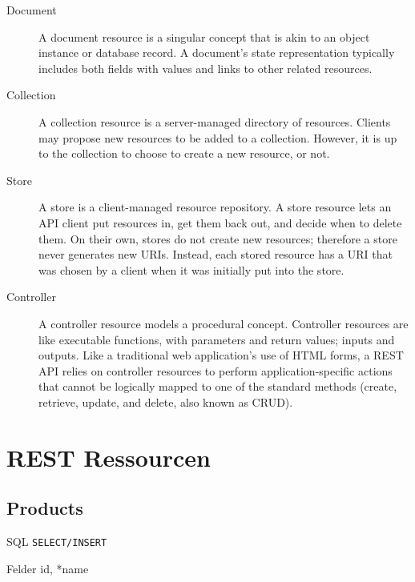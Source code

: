 \documentclass[10pt,a4paper]{scrartcl}
\begin{document}
\begin{description}
	\item[Document] A document resource is a singular concept that is akin to an object instance or database
		record. A document’s state representation typically includes both fields with values and
		links to other related resources.
	\item[Collection] A collection resource is a server-managed directory of resources. Clients may propose
		new resources to be added to a collection. However, it is up to the collection to choose
		to create a new resource, or not.
	\item[Store] A store is a client-managed resource repository. A store resource lets an API client put
		resources in, get them back out, and decide when to delete them. On their own, stores
		do not create new resources; therefore a store never generates new URIs. Instead, each
		stored resource has a URI that was chosen by a client when it was initially put into the
		store.
	\item[Controller] A controller resource models a procedural concept. Controller resources are like
		executable functions, with parameters and return values; inputs and outputs.
		Like a traditional web application’s use of HTML forms, a REST API relies on controller
		resources to perform application-specific actions that cannot be logically mapped to
		one of the standard methods (create, retrieve, update, and delete, also known as
		CRUD).
\end{description}

\pagebreak
\section{REST Ressourcen}

\subsection{Products}

\begin{description*}
    \item[SQL] \texttt{SELECT/INSERT}
    \item[Felder] id, *name
\end{description*}
\end{document}
